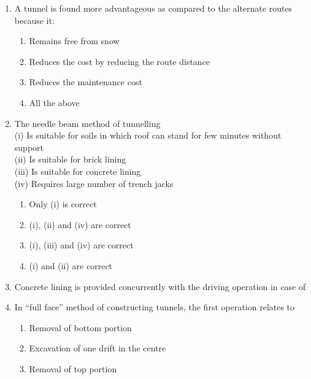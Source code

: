 \documentclass[11pt,a4paper]{article}
\begin{document}
\begin{enumerate}
\item{A tunnel is found more advantageous as compared to the alternate routes because it:}
\begin{enumerate}[label=\Alph*.]
\item{Remains free from snow}
\item{Reduces the cost by reducing the route distance}
\item{Reduces the maintenance cost}
\item{All the above}
\end{enumerate}
\item{The needle beam method of tunnelling \\
 (i) Is suitable for soils in which roof can stand for few minutes without support \\
 (ii) Is suitable for brick lining \\
 (iii) Is suitable for concrete lining \\
 (iv) Requires large number of trench jacks}
\begin{enumerate}[label=\Alph*.]
\item{Only (i) is correct}
\item{(i), (ii) and (iv) are correct}
\item{(i), (iii) and (iv) are correct}
\item{(i) and (ii) are correct}
\end{enumerate}
\item{Concrete lining is provided concurrently with the driving operation in case of}
\\
\item{In ``full face'' method of constructing tunnels, the first operation relates to
}
\begin{enumerate}[label=\Alph*.]
\item{Removal of bottom portion}
\item{Excavation of one drift in the centre}
\item{Removal of top portion}

\end{enumerate}
\end{enumerate}
\end{document}
